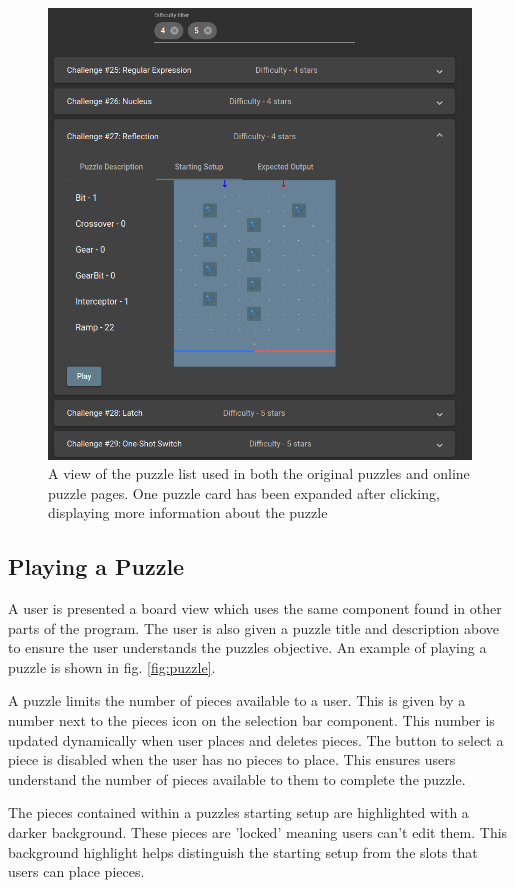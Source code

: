 \documentclass{l4proj}
\begin{document}
\begin{figure}
    \centering
    \includegraphics[width=0.65\linewidth]{images/puzzleList.png}
    \caption{A view of the puzzle list used in both the original puzzles and online puzzle pages. One puzzle card has been expanded after clicking, displaying more information about the puzzle}
    \label{fig:puzzleList}
\end{figure}

\subsection{Playing a Puzzle}
A user is presented a board view which uses the same component found in other parts of the program. The user is also given a puzzle title and description above to ensure the user understands the puzzles objective. An example of playing a puzzle is shown in fig. \ref{fig:puzzle}.

A puzzle limits the number of pieces available to a user. This is given by a number next to the pieces icon on the selection bar component. This number is updated dynamically when user places and deletes pieces. The button to select a piece is disabled when the user has no pieces to place. This ensures users understand the number of pieces available to them to complete the puzzle. 

The pieces contained within a puzzles starting setup are highlighted with a darker background. These pieces are 'locked' meaning users can't edit them. This background highlight helps distinguish the starting setup from the slots that users can place pieces. 

\end{document}

